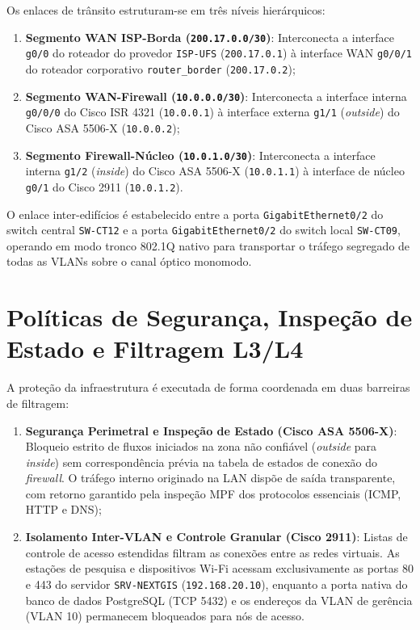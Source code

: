 Os enlaces de trânsito estruturam-se em três níveis hierárquicos:
\begin{enumerate}
    \item \textbf{Segmento WAN ISP-Borda (\texttt{200.17.0.0/30})}: Interconecta a interface \texttt{g0/0} do roteador do provedor \texttt{ISP-UFS} (\texttt{200.17.0.1}) à interface WAN \texttt{g0/0/1} do roteador corporativo \texttt{router\_border} (\texttt{200.17.0.2});
    \item \textbf{Segmento WAN-Firewall (\texttt{10.0.0.0/30})}: Interconecta a interface interna \texttt{g0/0/0} do Cisco ISR 4321 (\texttt{10.0.0.1}) à interface externa \texttt{g1/1} (\textit{outside}) do Cisco ASA 5506-X (\texttt{10.0.0.2});
    \item \textbf{Segmento Firewall-Núcleo (\texttt{10.0.1.0/30})}: Interconecta a interface interna \texttt{g1/2} (\textit{inside}) do Cisco ASA 5506-X (\texttt{10.0.1.1}) à interface de núcleo \texttt{g0/1} do Cisco 2911 (\texttt{10.0.1.2}).
\end{enumerate}

O enlace inter-edifícios é estabelecido entre a porta \texttt{GigabitEthernet0/2} do switch central \texttt{SW-CT12} e a porta \texttt{GigabitEthernet0/2} do switch local \texttt{SW-CT09}, operando em modo tronco 802.1Q nativo para transportar o tráfego segregado de todas as VLANs sobre o canal óptico monomodo.

\section{Políticas de Segurança, Inspeção de Estado e Filtragem L3/L4}

A proteção da infraestrutura é executada de forma coordenada em duas barreiras de filtragem:
\begin{enumerate}
    \item \textbf{Segurança Perimetral e Inspeção de Estado (Cisco ASA 5506-X)}: Bloqueio estrito de fluxos iniciados na zona não confiável (\textit{outside} para \textit{inside}) sem correspondência prévia na tabela de estados de conexão do \textit{firewall}. O tráfego interno originado na LAN dispõe de saída transparente, com retorno garantido pela inspeção MPF dos protocolos essenciais (ICMP, HTTP e DNS);
    \item \textbf{Isolamento Inter-VLAN e Controle Granular (Cisco 2911)}: Listas de controle de acesso estendidas filtram as conexões entre as redes virtuais. As estações de pesquisa e dispositivos Wi-Fi acessam exclusivamente as portas 80 e 443 do servidor \texttt{SRV-NEXTGIS} (\texttt{192.168.20.10}), enquanto a porta nativa do banco de dados PostgreSQL (TCP 5432) e os endereços da VLAN de gerência (VLAN 10) permanecem bloqueados para nós de acesso.
\end{enumerate}

